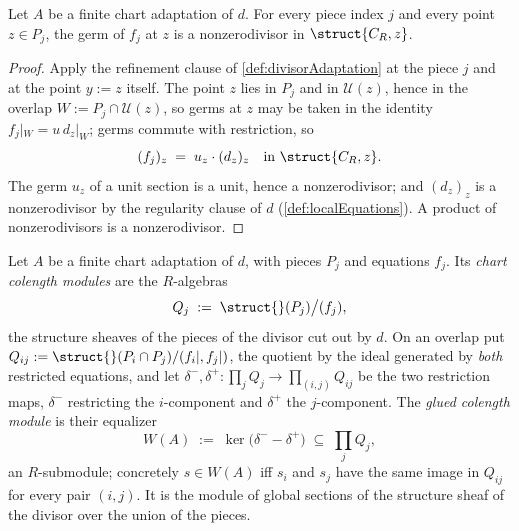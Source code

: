 \begin{lemma}
  \label{lem:divisorAdaptation_eqn_regular}
  \leanok
  Let \(A\) be a finite chart adaptation of \(d\). For every piece index \(j\) and every
  point \(z \in P_j\), the germ of \(f_j\) at \(z\) is a nonzerodivisor in
  \(\struct{C_R,z}\).
\end{lemma}
\begin{proof}
  \leanok
  Apply the refinement clause of \ref{def:divisorAdaptation} at the piece \(j\) and at the
  point \(y := z\) itself. The point \(z\) lies in \(P_j\) and in \(\mathcal U(z)\), hence
  in the overlap \(W := P_j \cap \mathcal U(z)\), so germs at \(z\) may be taken in the
  identity \(f_j|_W = u\, d_z|_W\); germs commute with restriction, so
  \[
    (f_j)_z \;=\; u_z \cdot (d_z)_z \quad\text{in } \struct{C_R,z}.
  \]
  The germ \(u_z\) of a unit section is a unit, hence a nonzerodivisor; and \((d_z)_z\) is
  a nonzerodivisor by the regularity clause of \(d\) (\ref{def:localEquations}). A product
  of nonzerodivisors is a nonzerodivisor.
\end{proof}

\begin{definition}
  \label{def:gluedColength}
  \leanok
  Let \(A\) be a finite chart adaptation of \(d\), with pieces \(P_j\) and equations
  \(f_j\). Its \emph{chart colength modules} are the \(R\)-algebras
  \[
    Q_j \;:=\; \struct{}(P_j) \big/ (f_j),
  \]
  the structure sheaves of the pieces of the divisor cut out by \(d\). On an overlap put
  \(Q_{ij} := \struct{}(P_i \cap P_j)/(f_i|, f_j|)\), the quotient by the ideal generated
  by \emph{both} restricted equations, and let \(\delta^-, \delta^+ \colon \prod_j Q_j \to
  \prod_{(i,j)} Q_{ij}\) be the two restriction maps, \(\delta^-\) restricting the
  \(i\)-component and \(\delta^+\) the \(j\)-component. The \emph{glued colength module} is
  their equalizer
  \[
    W(A) \;:=\; \ker\bigl(\delta^- - \delta^+\bigr) \;\subseteq\; \prod_j Q_j ,
  \]
  an \(R\)-submodule; concretely \(s \in W(A)\) iff \(s_i\) and \(s_j\) have the same image
  in \(Q_{ij}\) for every pair \((i,j)\). It is the module of global sections of the
  structure sheaf of the divisor over the union of the pieces.
\end{definition}

